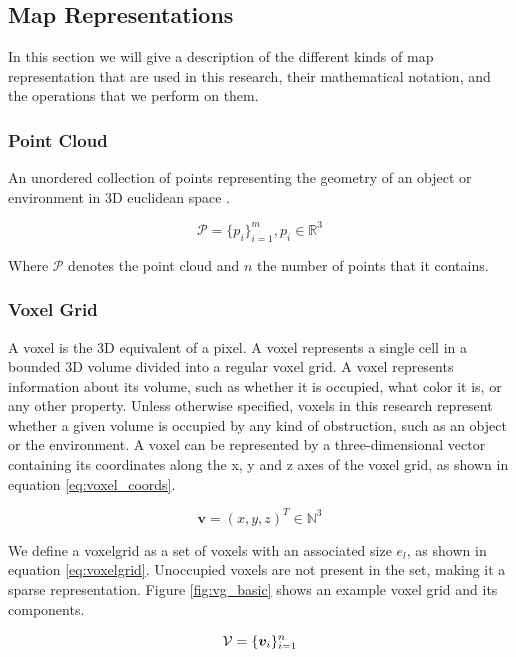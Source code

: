 \subsection{Map Representations}
In this section we will give a description of the different kinds of map representation that are used in this research, their mathematical notation, and the operations that we perform on them.

\subsubsection{Point Cloud}
An unordered collection of points representing the geometry of an object or environment in 3D euclidean space \citep{volodine_point_2007}.

\begin{equation}
\mathcal{P}=\{p_i\}_{i=1}^m, p_i \in \mathbb{R}^3
\end{equation}

Where \(\mathcal{P}\) denotes the point cloud and \(n\) the number of points that it contains.

\subsubsection{Voxel Grid}
A voxel is the 3D equivalent of a pixel. A voxel represents a single cell in a bounded 3D volume divided into a regular voxel grid. A voxel represents information about its volume, such as whether it is occupied, what color it is, or any other property. Unless otherwise specified, voxels in this research represent whether a given volume is occupied by any kind of obstruction, such as an object or the environment. A voxel can be represented by a three-dimensional vector containing its coordinates along the x, y and z axes of the voxel grid, as shown in equation \ref{eq:voxel_coords}. 

\begin{equation}
    \label{eq:voxel_coords}
    \boldsymbol{v} = (x, y, z)^T \in \mathbb{N}^{3}
\end{equation}

We define a \gls{voxelgrid} as a set of voxels with an associated size \(e_{l}\), as shown in equation \ref{eq:voxelgrid}. Unoccupied voxels are not present in the set, making it a sparse representation. Figure \ref{fig:vg_basic} shows an example voxel grid and its components.

\begin{equation}
    \label{eq:voxelgrid}
    \mathcal{V}=\{\boldsymbol{v}_{i}\}_{i=1}^{n}
\end{equation}


